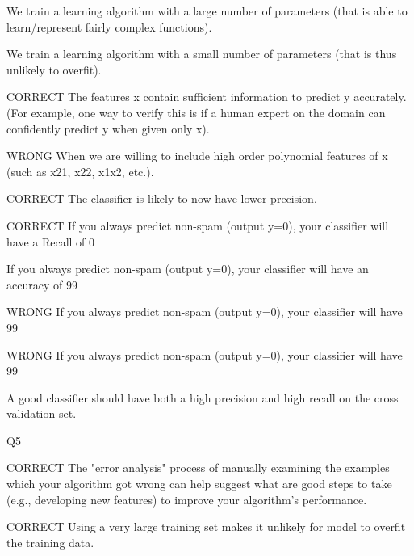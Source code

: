 \documentclass[11pt]{article} %
\begin{document}
We train a learning algorithm with a large number of parameters (that is able to learn/represent fairly complex functions).

We train a learning algorithm with a small number of parameters (that is thus unlikely to overfit).

CORRECT The features x contain sufficient information to predict y accurately. (For example, one way to verify this is if a human expert on the domain can confidently predict y when given only x).

WRONG When we are willing to include high order polynomial features of x (such as x21, x22, x1x2, etc.).


CORRECT The classifier is likely to now have lower precision.



CORRECT If you always predict non-spam (output y=0), your classifier will have a Recall of 0%

If you always predict non-spam (output y=0), your classifier will have an accuracy of 99%

WRONG If you always predict non-spam (output y=0), your classifier will have 99%

WRONG If you always predict non-spam (output y=0), your classifier will have 99%

 A good classifier should have both a high precision and high recall on the cross validation set.

Q5

CORRECT The "error analysis" process of manually examining the examples which your algorithm got wrong
can help suggest what are good steps to take (e.g., developing new features) to improve your algorithm's
performance.

CORRECT
Using a very large training set makes it unlikely for model to overfit the training data.
\end{document}
